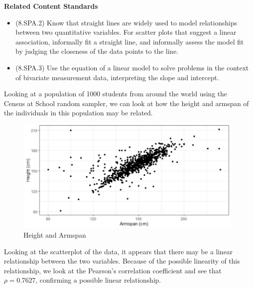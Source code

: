 \documentclass[
]{book}
\providecommand{\tightlist}{%
  \setlength{\itemsep}{0pt}\setlength{\parskip}{0pt}}
\newenvironment{standards}{}{}
\theoremstyle{definition}
\theoremstyle{definition}
\theoremstyle{definition}
\theoremstyle{definition}
\theoremstyle{remark}
\begin{document}
\begin{standards}

\begin{center}
\textbf{Related Content Standards}

\end{center}

\begin{itemize}
\tightlist
\item
  (8.SPA.2) Know that straight lines are widely used to model relationships between two quantitative variables. For scatter plots that suggest a linear association, informally fit a straight line, and informally assess the model fit by judging the closeness of the data points to the line.
\item
  (8.SPA.3) Use the equation of a linear model to solve problems in the context of bivariate measurement data, interpreting the slope and intercept.
\end{itemize}

\end{standards}

Looking at a population of 1000 students from around the world using the Census at School random sampler, we can look at how the height and armspan of the individuals in this population may be related.

\begin{figure}

{\centering \includegraphics[width=0.8\linewidth]{images/Armspan_Height} 

}

\caption{Height and Armspan}\label{fig:unnamed-chunk-202}
\end{figure}

Looking at the scatterplot of the data, it appears that there may be a linear relationship between the two variables. Because of the possible linearity of this relationship, we look at the Pearson's correlation coefficient and see that \(\rho = 0.7627\), confirming a possible linear relationship.
\end{document}
